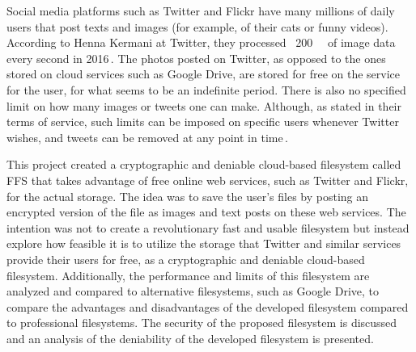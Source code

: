 Social media platforms such as Twitter and Flickr have many millions of daily users that post texts and images (for example, of their cats or funny videos). According to Henna Kermani at Twitter, they processed ~\SI{200}{\giga\byte} of image data every second in 2016\,\cite{MobileScaleLondona}. The photos posted on Twitter, as opposed to the ones stored on cloud services such as Google Drive, are stored for free on the service for the user, for what seems to be an indefinite period. There is also no specified limit on how many images or tweets one can make. Although, as stated in their terms of service, such limits can be imposed on specific users whenever Twitter wishes, and tweets can be removed at any point in time\,\cite{twitterTwitterTermsService2021}.

This project created a cryptographic and deniable \mbox{cloud-based} filesystem called \gls{FFS} that takes advantage of free online web services, such as Twitter and Flickr, for the actual storage. The idea was to save the user's files by posting an encrypted version of the file as images and text posts on these web services. The intention was not to create a revolutionary fast and usable filesystem but instead explore how feasible it is to utilize the storage that Twitter and similar services provide their users for free, as a cryptographic and deniable \mbox{cloud-based} filesystem. Additionally, the performance and limits of this filesystem are analyzed and compared to alternative filesystems, such as Google Drive, to compare the advantages and disadvantages of the developed filesystem compared to professional filesystems. The security of the proposed filesystem is discussed and an analysis of the deniability of the developed filesystem is presented.











